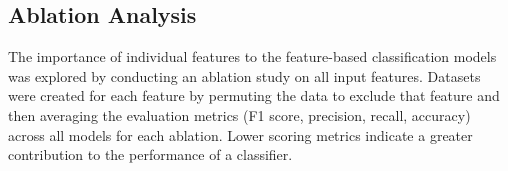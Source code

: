 \documentclass[pdflatex,sn-mathphys-num]{sn-jnl}%
\begin{document}





\subsection{Ablation Analysis}

The importance of individual features to the feature-based classification models was explored by conducting an ablation study on all input features. Datasets were created for each feature by permuting the data to exclude that feature and then averaging the evaluation metrics (F1 score, precision, recall, accuracy) across all models for each ablation. Lower scoring metrics indicate a greater contribution to the performance of a classifier.
\end{document}
